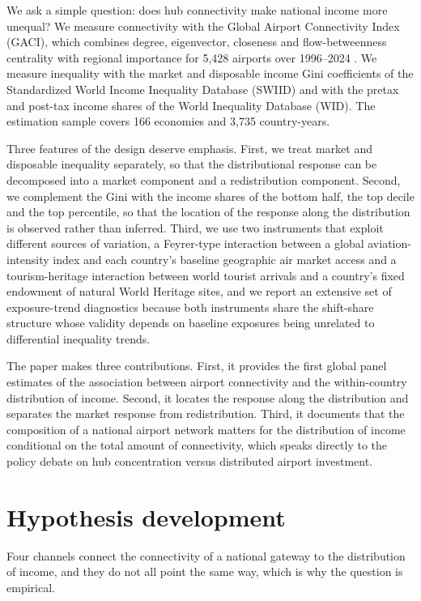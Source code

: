 \documentclass[12pt]{article}
\begin{document}
We ask a simple question: does hub connectivity make national income more unequal? We measure connectivity with the Global Airport Connectivity Index (GACI), which combines degree, eigenvector, closeness and flow-betweenness centrality with regional importance for 5,428 airports over 1996--2024 \citep{Cheung_2020}. We measure inequality with the market and disposable income Gini coefficients of the Standardized World Income Inequality Database (SWIID) and with the pretax and post-tax income shares of the World Inequality Database (WID). The estimation sample covers 166 economies and 3,735 country-years.

Three features of the design deserve emphasis. First, we treat market and disposable inequality separately, so that the distributional response can be decomposed into a market component and a redistribution component. Second, we complement the Gini with the income shares of the bottom half, the top decile and the top percentile, so that the location of the response along the distribution is observed rather than inferred. Third, we use two instruments that exploit different sources of variation, a Feyrer-type interaction between a global aviation-intensity index and each country's baseline geographic air market access \citep{Feyrer_2019} and a tourism-heritage interaction between world tourist arrivals and a country's fixed endowment of natural World Heritage sites, and we report an extensive set of exposure-trend diagnostics because both instruments share the shift-share structure whose validity depends on baseline exposures being unrelated to differential inequality trends.

The paper makes three contributions. First, it provides the first global panel estimates of the association between airport connectivity and the within-country distribution of income. Second, it locates the response along the distribution and separates the market response from redistribution. Third, it documents that the composition of a national airport network matters for the distribution of income conditional on the total amount of connectivity, which speaks directly to the policy debate on hub concentration versus distributed airport investment.

\section{Hypothesis development}
\label{sec:framework}
Four channels connect the connectivity of a national gateway to the distribution of income, and they do not all point the same way, which is why the question is empirical.
\end{document}
